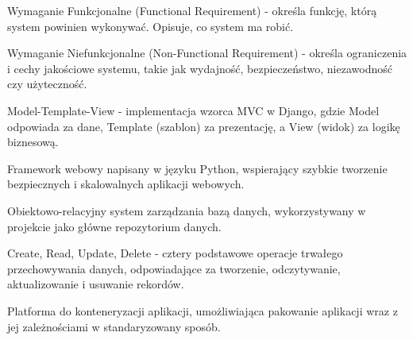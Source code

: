 \documentclass[12pt,a4paper]{article}
\begin{document}
\begin{description}[leftmargin=3.5cm, style=sameline, labelwidth=3cm]
    \item[F] Wymaganie Funkcjonalne (Functional Requirement) - określa funkcję, którą system powinien wykonywać. Opisuje, co system ma robić.
    
    \item[NF] Wymaganie Niefunkcjonalne (Non-Functional Requirement) - określa ograniczenia i cechy jakościowe systemu, takie jak wydajność, bezpieczeństwo, niezawodność czy użyteczność.

    \item[MTV] Model-Template-View - implementacja wzorca MVC w Django, gdzie Model odpowiada za dane, Template (szablon) za prezentację, a View (widok) za logikę biznesową.
    
    \item[Django] Framework webowy napisany w języku Python, wspierający szybkie tworzenie bezpiecznych i skalowalnych aplikacji webowych.
    
    \item[PostgreSQL] Obiektowo-relacyjny system zarządzania bazą danych, wykorzystywany w projekcie jako główne repozytorium danych.
    
    \item[CRUD] Create, Read, Update, Delete - cztery podstawowe operacje trwałego przechowywania danych, odpowiadające za tworzenie, odczytywanie, aktualizowanie i usuwanie rekordów.
    
    \item[Docker] Platforma do konteneryzacji aplikacji, umożliwiająca pakowanie aplikacji wraz z jej zależnościami w standaryzowany sposób.
\end{description}
\end{document}

